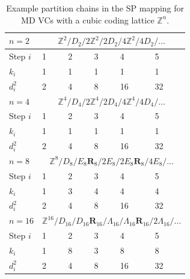 \documentclass[journal]{IEEEtran}
\newcommand{\Z}{\mathbb{Z}}
\newcommand{\bR}{\boldsymbol{R}}
\begin{document}
\begin{table}[tbp]
  \renewcommand{\arraystretch}{1.2}
  \renewcommand{\tabcolsep}{12pt}
  \caption{Example partition chains in the SP mapping for MD VCs with a cubic coding lattice $\Z^n$.}
  \label{tab:partition chain}
  \centering
  \begin{tabular}{l l l l l l}
    \hline 
    $n=2$ & \multicolumn{5}{c}{$\Z^2/D_2/2\Z^2/2D_2/4\Z^2/4D_2/\dots$} \\
    \hline 
    Step $i$ & 1 & 2 &3 &4 &5\\
    $k_i$ & 1 & 1& 1 &1&1\\
    $d_i^2$ & 2 &4& 8&16&32\\
    \hline \hline
    $n=4$ & \multicolumn{5}{c}{$\Z^4/D_4/2\Z^4/2D_4/4\Z^4/4D_4/\dots$} \\
    \hline 
    Step $i$ & 1 & 2 &3 &4 &5\\
    $k_i$ & 1 & 1& 1 &1&1\\
    $d_i^2$ & 2 &4& 8&16&32\\
    \hline \hline
    $n=8$ & \multicolumn{5}{c}{$\Z^8/D_8/E_8\bR_{8}/2E_8/2E_8\bR_{8}/4E_8/\dots$} \\
    \hline 
    Step $i$ & 1 & 2 &3 &4 &5\\
    $k_i$ & 1 & 3& 4 &4&4\\
    $d_i^2$ & 2 & 4& 8 &16& 32\\
    \hline \hline
        $n=16$ & \multicolumn{5}{c}{$\Z^{16}/D_{16}/D_{16}\bR_{16}/\Lambda_{16}/\Lambda_{16}\bR_{16}/2\Lambda_{16}/\dots$} \\
    \hline 
    Step $i$ & 1 & 2 &3 &4 &5\\
    $k_i$ & 1 & 8 & 3 & 8 &8\\
    $d_i^2$ & 2 & 4& 8 &16& 32\\
    \hline
  \end{tabular}
\end{table}
\end{document}
